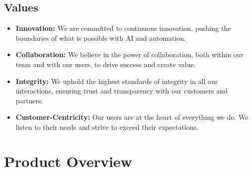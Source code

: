 \subsection{Values}
\begin{itemize}
    \item \textbf{Innovation:} We are committed to continuous innovation, pushing the boundaries of what is possible with AI and automation.
    \item \textbf{Collaboration:} We believe in the power of collaboration, both within our team and with our users, to drive success and create value.
    \item \textbf{Integrity:} We uphold the highest standards of integrity in all our interactions, ensuring trust and transparency with our customers and partners.
    \item \textbf{Customer-Centricity:} Our users are at the heart of everything we do. We listen to their needs and strive to exceed their expectations.
\end{itemize}


\section{Product Overview}
